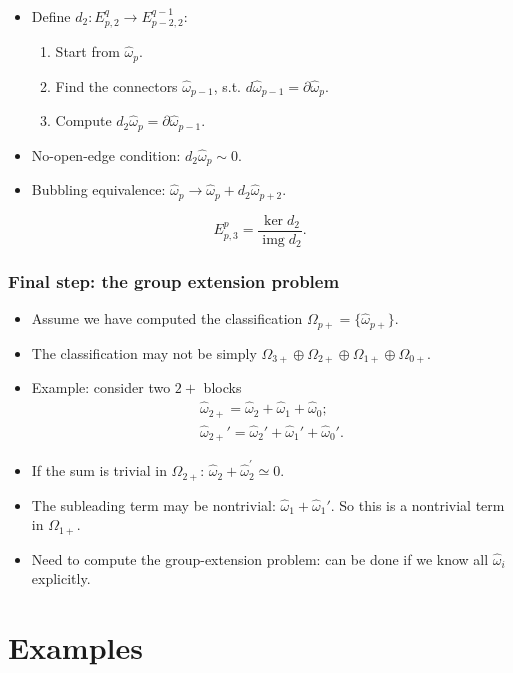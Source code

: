 \documentclass[xcolor=table, 10pt, aspectratio=43]{beamer}
\DeclareMathOperator{\img}{img}
\begin{document}
\begin{frame}
\begin{center}
\begin{animateinline}{5}
{
}
\end{animateinline}
\end{center}
\begin{itemize}
\item Define $d_2:E^q_{p,2}\rightarrow E^{q-1}_{p-2,2}$:
\begin{enumerate}
\item Start from $\hat\omega_p$.
\item Find the connectors $\hat\omega_{p-1}$, s.t. $d\hat\omega_{p-1}=\partial\hat\omega_p$.
\item Compute $d_2\hat\omega_p=\partial\hat\omega_{p-1}$.
\end{enumerate}
\item No-open-edge condition: $d_2\hat\omega_p\sim0$.
\item Bubbling equivalence: $\hat\omega_p\rightarrow\hat\omega_p+d_2\hat\omega_{p+2}$.
\end{itemize}
\[E^p_{p,3}=\frac{\ker d_2}{\img d_2}.\]
\end{frame}

\begin{frame}
\frametitle{Final step: the group extension problem}
\begin{itemize}
\item Assume we have computed the classification $\Omega_{p+}=\{\hat\omega_{p+}\}$.
\item The classification may not be simply $\Omega_{3+}\oplus\Omega_{2+}\oplus \Omega_{1+} \oplus \Omega_{0+} $.
\item Example: consider two $2+$ blocks
\begin{align*}
\hat\omega_{2+}=\hat\omega_2+\hat\omega_1+\hat\omega_0;\\
\hat\omega_{2+}'=\hat\omega_2'+\hat\omega_1'+\hat\omega_0'.
\end{align*}
\item If the sum is trivial in $\Omega_{2+}$: $\hat\omega_2+\hat\omega_2^\prime\simeq0$.
\item The subleading term may be nontrivial: $\hat\omega_1+\hat\omega_1'$. So this is a nontrivial term in $\Omega_{1+}$.
\item Need to compute the group-extension problem: can be done if we know all $\hat\omega_i$ explicitly.
\end{itemize}
\end{frame}

\section{Examples}
\end{document}
